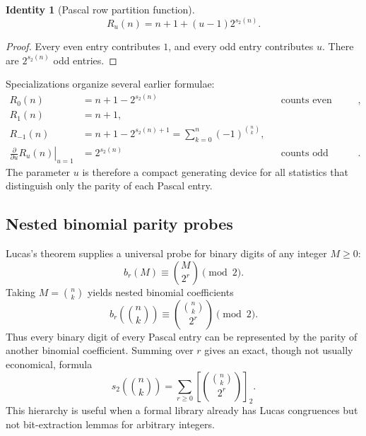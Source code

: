 \documentclass[11pt,oneside]{article}
\newtheorem{identity}[theorem]{Identity}
\theoremstyle{definition}
\theoremstyle{remark}
\newcommand{\bitsum}{s_2}
\begin{document}
\begin{identity}[Pascal row partition function]\label{id:Ru}
\begin{equation}\label{eq:Ru}
 R_u(n)=n+1+(u-1)2^{\bitsum(n)}.
\end{equation}
\end{identity}

\begin{proof}
Every even entry contributes $1$, and every odd entry contributes $u$.
There are $2^{\bitsum(n)}$ odd entries.
\end{proof}

Specializations organize several earlier formulae:
\begin{align*}
 R_0(n)&=n+1-2^{\bitsum(n)} &&\text{counts even entries},\\
 R_1(n)&=n+1,\\
 R_{-1}(n)&=n+1-2^{\bitsum(n)+1}
           =\sum_{k=0}^{n}(-1)^{\binom nk},\\
 \left.\frac{\partial}{\partial u}R_u(n)\right|_{u=1}
 &=2^{\bitsum(n)} &&\text{counts odd entries}.
\end{align*}
The parameter $u$ is therefore a compact generating device for all statistics
that distinguish only the parity of each Pascal entry.

\subsection{Nested binomial parity probes}

Lucas's theorem supplies a universal probe for binary digits of any integer
$M\ge0$:
\begin{equation}\label{eq:nested-bit-probe}
 b_r(M)\equiv\binom{M}{2^r}\pmod2.
\end{equation}
Taking $M=\binom nk$ yields nested binomial coefficients
\begin{equation}\label{eq:nested-pascal-probe}
 b_r\!\left(\binom nk\right)
 \equiv
 \binom{\binom nk}{2^r}\pmod2.
\end{equation}
Thus every binary digit of every Pascal entry can be represented by the parity
of another binomial coefficient.  Summing over $r$ gives an exact, though not
usually economical, formula
\begin{equation}\label{eq:nested-digit-sum}
 \bitsum\!\left(\binom nk\right)
 =\sum_{r\ge0}
   \left[\binom{\binom nk}{2^r}\right]_2.
\end{equation}
This hierarchy is useful when a formal library already has Lucas congruences
but not bit-extraction lemmas for arbitrary integers.
\end{document}
